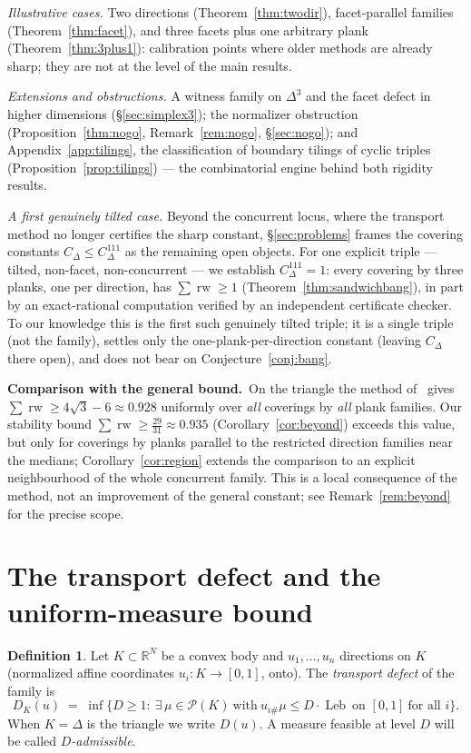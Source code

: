 \documentclass{aims}
\numberwithin{equation}{section}
\theoremstyle{plain}
\theoremstyle{definition}
\newtheorem{definition}[theorem]{Definition}
\theoremstyle{remark}
\newcommand{\rw}{\operatorname{rw}}
\newcommand{\Leb}{\operatorname{Leb}}
\newcommand{\R}{\mathbb{R}}
\begin{document}
\emph{Illustrative cases.} Two directions (Theorem~\ref{thm:twodir}),
facet-parallel families (Theorem~\ref{thm:facet}), and three facets plus one
arbitrary plank (Theorem~\ref{thm:3plus1}): calibration points where older
methods are already sharp; they are not at the level of the main results.

\emph{Extensions and obstructions.} A witness family on $\Delta^3$ and the
facet defect in higher dimensions (\S\ref{sec:simplex3}); the normalizer
obstruction (Proposition~\ref{thm:nogo}, Remark~\ref{rem:nogo},
\S\ref{sec:nogo}); and Appendix~\ref{app:tilings}, the classification of
boundary tilings of cyclic triples (Proposition~\ref{prop:tilings}) --- the
combinatorial engine behind both rigidity results.

\emph{A first genuinely tilted case.} Beyond the concurrent locus, where the
transport method no longer certifies the sharp constant, \S\ref{sec:problems}
frames the covering constants $C_\Delta\le C^{111}_\Delta$ as the remaining
open objects. For one explicit triple --- tilted, non-facet, non-concurrent ---
we establish $C^{111}_\Delta=1$: every covering by three planks, one per
direction, has $\sum\rw\ge1$ (Theorem~\ref{thm:sandwichbang}), in part by an
exact-rational computation verified by an independent certificate checker. To
our knowledge this is the first such genuinely tilted triple; it is a single
triple (not the family), settles only the one-plank-per-direction constant
(leaving $C_\Delta$ there open), and does not bear on
Conjecture~\ref{conj:bang}.

\smallskip
\noindent\textbf{Comparison with the general bound.}\ On the triangle the
method of~\cite{BY26} gives $\sum\rw\ge4\sqrt3-6\approx0.928$ uniformly over
\emph{all} coverings by \emph{all} plank families. Our stability bound
$\sum\rw\ge\tfrac{29}{31}\approx0.935$ (Corollary~\ref{cor:beyond}) exceeds
this value, but only for coverings by planks parallel to the restricted
direction families near the medians; Corollary~\ref{cor:region} extends the
comparison to an explicit neighbourhood of the whole concurrent family. This
is a local consequence of the method, not an improvement of the general
constant; see Remark~\ref{rem:beyond} for the precise scope.

\section{The transport defect and the uniform-measure bound}\label{sec:measure}

\begin{definition}\label{def:defect}
Let $K\subset\R^N$ be a convex body and $u_1,\dots,u_n$ directions on $K$
(normalized affine coordinates $u_i:K\to[0,1]$, onto). The \emph{transport
defect} of the family is
\[
D_K(u)\;=\;\inf\bigl\{D\ge1:\ \exists\,\mu\in\mathcal P(K)\ \text{with}\
u_{i\#}\mu\le D\cdot\Leb\ \text{on }[0,1]\ \text{for all }i\bigr\}.
\]
When $K=\Delta$ is the triangle we write $D(u)$. A measure feasible at level
$D$ will be called \emph{$D$-admissible}.
\end{definition}
\end{document}
